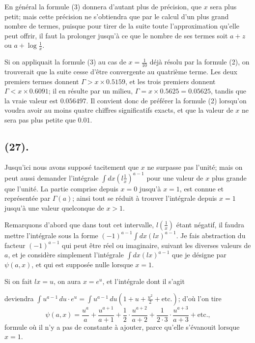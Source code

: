 \documentclass{article}
\begin{document}
En général la formule (3) donnera d'autant plus de précision, que $x$ sera plus petit; mais cette précision ne s'obtiendra que par le calcul d'un plus grand nombre de termes, puisque pour tirer de la suite toute l'approximation qu'elle peut offrir, il faut la prolonger jusqu'à ce que le nombre de ses termes soit $a+z$ ou $a+\log\frac{1}{x}$.

Si on appliquait la formule (3) au cas de $x=\frac{1}{10}$ déjà résolu par la formule (2), on trouverait que la suite cesse d'être convergente au quatrième terme. Les deux premiers termes donnent $\Gamma>x\times0.5159$, et les trois premiers donnent $\Gamma<x\times0.6091$; il en résulte par un milieu, $\Gamma=x\times0.5625=0.05625$, tandis que la vraie valeur est $0.056497$. Il convient donc de préférer la formule (2) lorsqu'on voudra avoir au moins quatre chiffres significatifs exacts, et que la valeur de $x$ ne sera pas plus petite que $0.01$.

\subsection*{(27).}

Jusqu'ici nous avons supposé tacitement que $x$ ne surpasse pas l'unité; mais on peut aussi demander l'intégrale $\displaystyle\int dx\left(l\frac{1}{x}\right)^{a-1}$ pour une valeur de $x$ plus grande que l'unité. La partie comprise depuis $x=0$ jusqu'à $x=1$, est connue et représentée par $\Gamma(a)$; ainsi tout se réduit à trouver l'intégrale depuis $x=1$ jusqu'à une valeur quelconque de $x>1$.

Remarquons d'abord que dans tout cet intervalle, $l\left(\frac{1}{x}\right)$ étant négatif, il faudra mettre l'intégrale sous la forme $(-1)^{a-1}\displaystyle\int dx(lx)^{a-1}$. Je fais abstraction du facteur $(-1)^{a-1}$ qui peut être réel ou imaginaire, suivant les diverses valeurs de $a$, et je considère simplement l'intégrale $\displaystyle\int dx(lx)^{a-1}$ que je désigne par $\psi(a,x)$, et qui est supposée nulle lorsque $x=1$.

Si on fait $lx=u$, on aura $x=e^{u}$, et l'intégrale dont il s'agit

deviendra $\displaystyle\int u^{a-1}\,du\cdot e^{u}=\displaystyle\int u^{a-1}\,du\left(1+u+\frac{u^{2}}{2}+\text{etc.}\right)$; d'où l'on tire
\[ \psi(a,x)=\frac{u^{a}}{a}+\frac{u^{a+1}}{a+1}+\frac{1}{2}\cdot\frac{u^{a+2}}{a+2}+\frac{1}{2\cdot3}\cdot\frac{u^{a+3}}{a+3}+\text{etc.}, \tag{4} \]
formule où il n'y a pas de constante à ajouter, parce qu'elle s'évanouit lorsque $x=1$.
\end{document}
